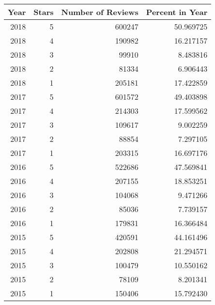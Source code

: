 \begin{tabular}{rrrr}
\toprule
 Year &  Stars &  Number of Reviews &  Percent in Year \\
\midrule
 2018 &      5 &             600247 &        50.969725 \\
 2018 &      4 &             190982 &        16.217157 \\
 2018 &      3 &              99910 &         8.483816 \\
 2018 &      2 &              81334 &         6.906443 \\
 2018 &      1 &             205181 &        17.422859 \\
 2017 &      5 &             601572 &        49.403898 \\
 2017 &      4 &             214303 &        17.599562 \\
 2017 &      3 &             109617 &         9.002259 \\
 2017 &      2 &              88854 &         7.297105 \\
 2017 &      1 &             203315 &        16.697176 \\
 2016 &      5 &             522686 &        47.569841 \\
 2016 &      4 &             207155 &        18.853251 \\
 2016 &      3 &             104068 &         9.471266 \\
 2016 &      2 &              85036 &         7.739157 \\
 2016 &      1 &             179831 &        16.366484 \\
 2015 &      5 &             420591 &        44.161496 \\
 2015 &      4 &             202808 &        21.294571 \\
 2015 &      3 &             100479 &        10.550162 \\
 2015 &      2 &              78109 &         8.201341 \\
 2015 &      1 &             150406 &        15.792430 \\
\bottomrule
\end{tabular}
